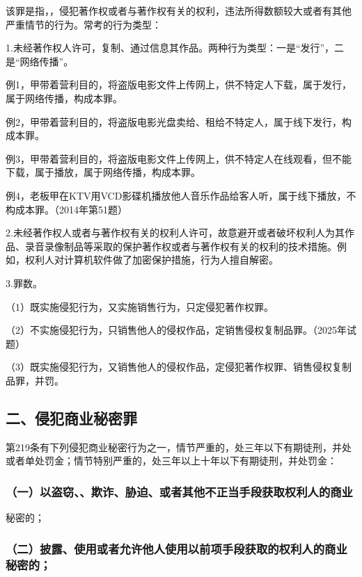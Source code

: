 该罪是指，，侵犯著作权或者与著作权有关的权利，违法所得数额较大或者有其他严重情节的行为。常考的行为类型：

1.未经著作权人许可，复制、通过信息其作品。两种行为类型：一是“发行”，二是“网络传播”。


例1，甲带着营利目的，将盗版电影文件上传网上，供不特定人下载，属于发行，属于网络传播，构成本罪。

例2，甲带着营利目的，将盗版电影光盘卖给、租给不特定人，属于线下发行，构成本罪。

例3，甲带着营利目的，将盗版电影文件上传网上，供不特定人在线观看，但不能下载，属于播放，属于网络传播，构成本罪。

例4，老板甲在KTV用VCD影碟机播放他人音乐作品给客人听，属于线下播放，不构成本罪。（2014年第51题）

2.未经著作权人或者与著作权有关的权利人许可，故意避开或者破坏权利人为其作品、录音录像制品等采取的保护著作权或者与著作权有关的权利的技术措施。例如，权利人对计算机软件做了加密保护措施，行为人擅自解密。

3.罪数。

（1）既实施侵犯行为，又实施销售行为，只定侵犯著作权罪。

（2）不实施侵犯行为，只销售他人的侵权作品，定销售侵权复制品罪。（2025年试题）

（3）既实施侵犯行为，又销售他人的侵权作品，定侵犯著作权罪、销售侵权复制品罪，并罚。

\subsection*{二、侵犯商业秘密罪}

第219条有下列侵犯商业秘密行为之一，情节严重的，处三年以下有期徒刑，并处或者单处罚金；情节特别严重的，处三年以上十年以下有期徒刑，并处罚金：

\subsubsection*{（一）以盗窃、、欺诈、胁迫、或者其他不正当手段获取权利人的商业}

秘密的；

\subsubsection*{（二）披露、使用或者允许他人使用以前项手段获取的权利人的商业秘密的；}

